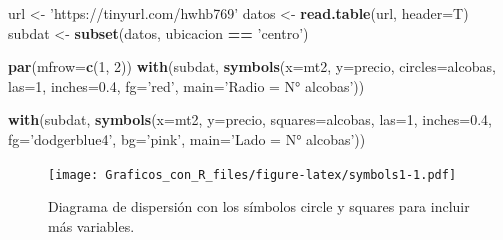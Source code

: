 \documentclass[10pt,]{krantz}
\makeatletter
\newenvironment{Shaded}{\begin{snugshade}}{\end{snugshade}}
\newcommand{\KeywordTok}[1]{\textcolor[rgb]{0.13,0.29,0.53}{\textbf{#1}}}
\newcommand{\DataTypeTok}[1]{\textcolor[rgb]{0.13,0.29,0.53}{#1}}
\newcommand{\DecValTok}[1]{\textcolor[rgb]{0.00,0.00,0.81}{#1}}
\newcommand{\FloatTok}[1]{\textcolor[rgb]{0.00,0.00,0.81}{#1}}
\newcommand{\StringTok}[1]{\textcolor[rgb]{0.31,0.60,0.02}{#1}}
\newcommand{\OperatorTok}[1]{\textcolor[rgb]{0.81,0.36,0.00}{\textbf{#1}}}
\newcommand{\NormalTok}[1]{#1}
\newenvironment{kframe}{%
\medskip{}
\setlength{\fboxsep}{.8em}
 \def\at@end@of@kframe{}%
 \ifinner\ifhmode%
  \def\at@end@of@kframe{\end{minipage}}%
  \begin{minipage}{\columnwidth}%
 \fi\fi%
 \def\FrameCommand##1{\hskip\@totalleftmargin \hskip-\fboxsep
 \colorbox{shadecolor}{##1}\hskip-\fboxsep
     \hskip-\linewidth \hskip-\@totalleftmargin \hskip\columnwidth}%
 \MakeFramed {\advance\hsize-\width
   \@totalleftmargin\z@ \linewidth\hsize
   \@setminipage}}%
 {\par\unskip\endMakeFramed%
 \at@end@of@kframe}
\renewenvironment{Shaded}{\begin{kframe}}{\end{kframe}}
\makeatother
\begin{document}
\begin{Shaded}
\begin{Highlighting}[]
\NormalTok{url <-}\StringTok{ 'https://tinyurl.com/hwhb769'}
\NormalTok{datos <-}\StringTok{ }\KeywordTok{read.table}\NormalTok{(url, }\DataTypeTok{header=}\NormalTok{T)}
\NormalTok{subdat <-}\StringTok{ }\KeywordTok{subset}\NormalTok{(datos, ubicacion }\OperatorTok{==}\StringTok{ 'centro'}\NormalTok{)}

\KeywordTok{par}\NormalTok{(}\DataTypeTok{mfrow=}\KeywordTok{c}\NormalTok{(}\DecValTok{1}\NormalTok{, }\DecValTok{2}\NormalTok{))}
\KeywordTok{with}\NormalTok{(subdat, }\KeywordTok{symbols}\NormalTok{(}\DataTypeTok{x=}\NormalTok{mt2, }\DataTypeTok{y=}\NormalTok{precio,}
                     \DataTypeTok{circles=}\NormalTok{alcobas, }
                     \DataTypeTok{las=}\DecValTok{1}\NormalTok{, }\DataTypeTok{inches=}\FloatTok{0.4}\NormalTok{, }
                     \DataTypeTok{fg=}\StringTok{'red'}\NormalTok{,}
                     \DataTypeTok{main=}\StringTok{'Radio = N° alcobas'}\NormalTok{))}

\KeywordTok{with}\NormalTok{(subdat, }\KeywordTok{symbols}\NormalTok{(}\DataTypeTok{x=}\NormalTok{mt2, }\DataTypeTok{y=}\NormalTok{precio,}
                     \DataTypeTok{squares=}\NormalTok{alcobas, }
                     \DataTypeTok{las=}\DecValTok{1}\NormalTok{, }\DataTypeTok{inches=}\FloatTok{0.4}\NormalTok{, }
                     \DataTypeTok{fg=}\StringTok{'dodgerblue4'}\NormalTok{, }\DataTypeTok{bg=}\StringTok{'pink'}\NormalTok{,}
                     \DataTypeTok{main=}\StringTok{'Lado = N° alcobas'}\NormalTok{))}
\end{Highlighting}
\end{Shaded}

\begin{figure}
\centering
\texttt{[image: Graficos\_con\_R\_files/figure-latex/symbols1-1.pdf]}
\caption{\label{fig:symbols1}Diagrama de dispersión con los símbolos circle
y squares para incluir más variables.}
\end{figure}
\end{document}
